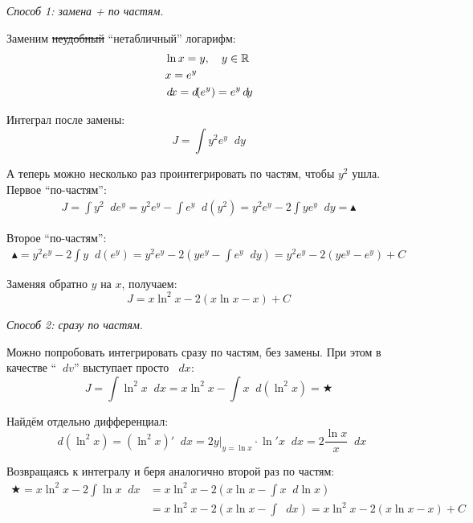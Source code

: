 \documentclass[a4paper,12pt]{article}
\newcommand{\diff}{\mathop{}\!d\!}
\begin{document}
  \begin{solution}
    \mbox{}\par
    \emph{Способ 1: замена + по частям}.
    
    Заменим \sout{неудобный} ``нетабличный'' логарифм:
    \[
      \begin{aligned}
        &\ln x = y,\quad y \in \RR\\
        &x = e^y\\
        &\diff x = \diff (e^y) = e^y \diff y
      \end{aligned}
    \]
    
    Интеграл после замены:
    \[
      J = \int y^2 e^y \diff y
    \]
    
    А теперь можно несколько раз проинтегрировать по частям, чтобы $y^2$ ушла.
    Первое ``по-частям'':
    \begin{equation}
    \begin{split}
      J = \int y^2 \diff e^y
        = y^2 e^y - \int e^y \diff (y^2)
        = y^2 e^y - 2 \int y e^y \diff y
        = \blacktriangle
    \end{split}
    \end{equation}
    
    Второе ``по-частям'':
    \begin{equation}
    \begin{split}
      \blacktriangle = y^2 e^y - 2 \int y \diff (e^y)
        = y^2 e^y - 2 \left(y e^y - \int e^y \diff y\right)
        = y^2 e^y - 2 (y e^y - e^y) + C
    \end{split}
    \end{equation}
    
    Заменяя обратно $y$ на $x$, получаем:
    \[
      J = x \ln^2 x - 2(x \ln x - x) + C
    \]
    
    
    \emph{Способ 2: сразу по частям}.
    
    Можно попробовать интегрировать сразу по частям, без замены.
    При этом в качестве ``$\diff v$'' выступает просто $\diff x$:
    \[
      J = \int \ln^2 x \diff x
        = x \ln^2 x - \int x \diff (\ln^2 x)
        = \bigstar 
    \]
    
    Найдём отдельно дифференциал:
    \[
      \diff (\ln^2 x) = \left(\ln^2 x\right)' \diff x = 2 y|_{y = \ln x} \cdot \ln' x \diff x = 2 \frac{\ln x}{x} \diff x
    \]
    
    Возвращаясь к интегралу и беря аналогично второй раз по частям:
    \begin{equation}
    \begin{split}
      \bigstar = x \ln^2 x - 2 \int \ln x \diff x
               &= x \ln^2 x - 2 \left(x \ln x - \int x \diff \ln x\right)\\
               &= x \ln^2 x - 2 \left(x \ln x - \int \diff x\right)
               = x \ln^2 x - 2 (x \ln x - x) + C
    \end{split}
    \end{equation}
    
  \end{solution}
  
\end{document}
